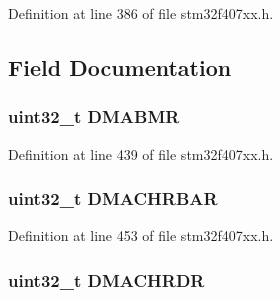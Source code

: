 Definition at line 386 of file stm32f407xx.\+h.



\subsection{Field Documentation}
\subsubsection[{\texorpdfstring{D\+M\+A\+B\+MR}{DMABMR}}]{ uint32\+\_\+t D\+M\+A\+B\+MR}\hypertarget{struct_e_t_h___type_def_ad1e11eb1200e64e0563e3576bf258194}{}\label{struct_e_t_h___type_def_ad1e11eb1200e64e0563e3576bf258194}


Definition at line 439 of file stm32f407xx.\+h.

\subsubsection[{\texorpdfstring{D\+M\+A\+C\+H\+R\+B\+AR}{DMACHRBAR}}]{ uint32\+\_\+t D\+M\+A\+C\+H\+R\+B\+AR}\hypertarget{struct_e_t_h___type_def_acf3f7ecbf774d8d505655ac7f24761fc}{}\label{struct_e_t_h___type_def_acf3f7ecbf774d8d505655ac7f24761fc}


Definition at line 453 of file stm32f407xx.\+h.

\subsubsection[{\texorpdfstring{D\+M\+A\+C\+H\+R\+DR}{DMACHRDR}}]{ uint32\+\_\+t D\+M\+A\+C\+H\+R\+DR}\hypertarget{struct_e_t_h___type_def_a9c49de2e699886d6604fd2b3d376a0e9}{}\label{struct_e_t_h___type_def_a9c49de2e699886d6604fd2b3d376a0e9}


